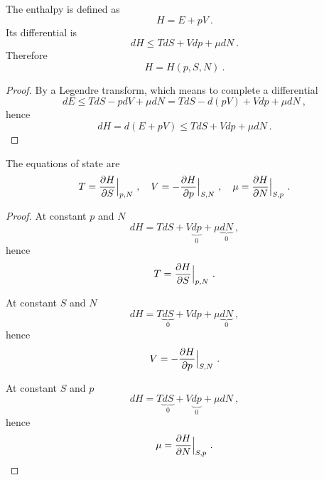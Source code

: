     The enthalpy is defined as 
    \begin{equation*}
        H = E + pV ~.
    \end{equation*}
    Its differential is 
    \begin{equation*}
        dH \leq TdS + Vdp + \mu dN ~.
    \end{equation*}
    Therefore
    \begin{equation*}
        H = H(p, S, N) ~.
    \end{equation*}
    \begin{proof}
        By a Legendre transform, which means to complete a differential
        \begin{equation*}
            dE \leq T dS - p dV + \mu dN = TdS - d(pV) + V dp + \mu dN ~,
        \end{equation*}
        hence 
        \begin{equation*}
            dH = d(E + pV) \leq TdS + Vdp + \mu dN ~.
        \end{equation*}
    \end{proof}

    The equations of state are
    \begin{equation}
        T = \frac{\partial H}{\partial S} \Big \vert_{p,N} ~, \quad V = - \frac{\partial H}{\partial p} \Big \vert_{S,N} ~, \quad \mu = \frac{\partial H}{\partial N} \Big \vert_{S, p} ~. 
    \end{equation}
    \begin{proof}
        At constant $p$ and $N$
        \begin{equation*}
            dH = TdS + V\underbrace{dp}_0 + \mu \underbrace{dN}_0 ~,
        \end{equation*}
        hence 
        \begin{equation*}
            T = \frac{\partial H}{\partial S} \Big \vert_{p,N} ~.
        \end{equation*}

        At constant $S$ and $N$
        \begin{equation*}
            dH = T\underbrace{dS}_0 + Vdp + \mu \underbrace{dN}_0~,
        \end{equation*}
        hence 
        \begin{equation*}
            V = - \frac{\partial H}{\partial p} \Big \vert_{S,N} ~.
        \end{equation*}

        At constant $S$ and $p$
        \begin{equation*}
            dH = T\underbrace{dS}_0 + V\underbrace{dp}_0 + \mu dN ~,
        \end{equation*}
        hence 
        \begin{equation*}
            \mu = \frac{\partial H}{\partial N} \Big \vert_{S, p} ~.
        \end{equation*}
    \end{proof}

